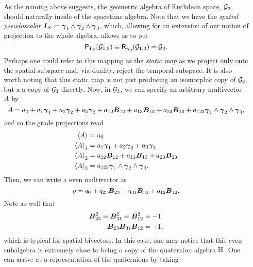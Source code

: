 As the naming above suggests, the geometric algebra of Euclidean space, $\G_3$, should naturally inside of the spacetime algebra. Note that we have the \emph{spatial pseudoscalar} $\blade{I}_S \coloneqq \blade{\gamma}_1 \wedge \blade{\gamma}_2 \wedge \blade{\gamma}_3$, which, allowing for an extension of our notion of projection to the whole algebra, allows us to put
\begin{equation}
\projection_{\blade{I}_S}(\G_{1,3}) \equiv \rejection_{\blade{\gamma}_0} (\G_{1,3}) = \G_3.
\end{equation}
Perhaps one could refer to this mapping as the \emph{static map} as we project only onto the spatial subspace and, via duality, reject the temporal subspace. It is also worth noting that this static map is not just producing an isomorphic copy of $\G_3$, but a a copy of $\G_3$ directly. Now, in $\G_3$, we can specify an arbitrary multivector $A$ by
\begin{equation}
A= a_0 + a_1 \blade{\gamma}_1 + a_2 \blade{\gamma}_2 + a_3 \blade{\gamma}_3 + a_{12} \blade{B}_{12} + a_{13} \blade{B}_{13} + a_{23} \blade{B}_{23} + a_{123} \blade{\gamma}_1 \wedge \blade{\gamma}_2 \wedge \blade{\gamma}_3,
\end{equation}
and so the grade projections read
\begin{subequations}
\begin{align}
\proj{}{A}&=a_0\\
\proj{1}{A}&=a_1 \blade{\gamma}_1 + a_2 \blade{\gamma}_2 + a_3 \blade{\gamma}_3\\
\proj{2}{A}&=a_{12} \blade{B}_{12} + a_{13} \blade{B}_{13} + a_{23} \blade{B}_{23}\\
\proj{3}{A}&= a_{123} \blade{\gamma}_1 \wedge \blade{\gamma}_2 \wedge \blade{\gamma}_3.
\end{align}
\end{subequations}
Then, we can write a even multivector as
\begin{equation}
q = q_0 + q_{23}\blade{B}_{23} + q_{31} \blade{B}_{31} + q_{12} \blade{B}_{12}.
\end{equation}
Note as well that
\begin{subequations}
\begin{align}
\blade{B}_{23}^2 = \blade{B}_{31}^2 = \blade{B}_{12}^2 &= -1\\
\blade{B}_{23}\blade{B}_{31}\blade{B}_{12} &= +1,
\end{align}
\end{subequations}
which is typical for spatial bivectors. In this case, one may notice that this even subalgebra is extremely close to being a copy of the quaternion algebra $\quat$. One can arrive at a representation of the quaternions by taking
